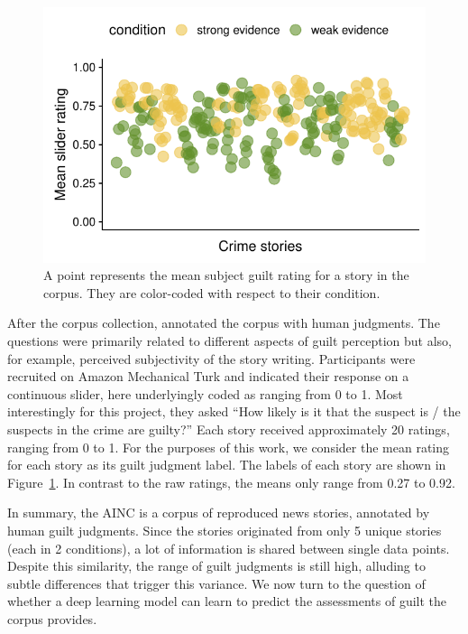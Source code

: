 \documentclass[11pt,a4paper]{article}
\begin{document}
\begin{figure}[t!]
	\includegraphics[width=\linewidth]{graphs/subjguilt.pdf}
	\caption{A point represents the mean subject guilt rating for a story in the corpus. They are color-coded with respect to their condition.}
	\label{fig:corpus-annotations}
\end{figure}

After the corpus collection, \citeauthor{Kreiss:2019} annotated the corpus with human judgments. The questions were primarily related to different aspects of guilt perception but also, for example, perceived subjectivity of the story writing. Participants were recruited on Amazon Mechanical Turk and indicated their response on a continuous slider, here underlyingly coded as ranging from 0 to 1. Most interestingly for this project, they asked ``How likely is it that the suspect is / the suspects in the crime are guilty?'' Each story received approximately 20 ratings, ranging from 0 to 1. For the purposes of this work, we consider the mean rating for each story as its guilt judgment label. The labels of each story are shown in Figure~\ref{fig:corpus-annotations}. In contrast to the raw ratings, the means only range from 0.27 to 0.92. 




In summary, the AINC is a corpus of reproduced news stories, annotated by human guilt judgments. Since the stories originated from only 5 unique stories (each in 2 conditions), a lot of information is shared between single data points.  Despite this similarity, the range of guilt judgments is still high, alluding to subtle differences that trigger this variance. We now turn to the question of whether a deep learning model can learn to predict the assessments of guilt the corpus provides.
\end{document}
